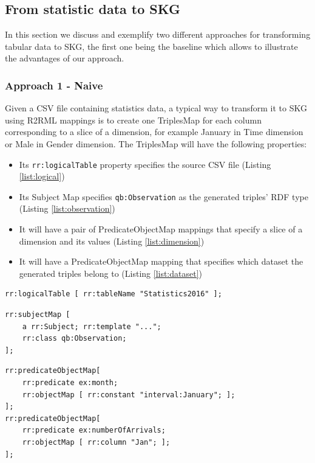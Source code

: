 \subsection{From statistic data to SKG}
In this section we discuss and exemplify two different approaches for transforming tabular data to SKG, the first one being the baseline which allows to illustrate the advantages of our approach.

\subsubsection{Approach 1 - Naive}
Given a CSV file containing statistics data, a typical way to transform it to SKG using R2RML mappings is to create one TriplesMap for each column corresponding to a slice of a dimension, for example January in Time dimension or Male in Gender dimension. The TriplesMap will have the following properties:
\begin{itemize}
\item Its \texttt{rr:logicalTable} property specifies the source CSV file (Listing \ref{list:logical})
\item Its Subject Map specifies \texttt{qb:Observation} as the generated triples’ RDF type (Listing \ref{list:observation})
\item It will have a pair of PredicateObjectMap mappings that specify a slice of a dimension and its values (Listing \ref{list:dimension})
\item It will have a PredicateObjectMap mapping that specifies which dataset the generated triples belong to (Listing \ref{list:dataset})
\end{itemize}

\begin{lstlisting}[float,caption=Data source mapping,frame=tlrb,label={list:logical}, columns=fullflexible]
rr:logicalTable [ rr:tableName "Statistics2016" ];
\end{lstlisting}

\begin{lstlisting}[float,caption=Observation mapping,frame=tlrb,label={list:observation}, columns=fullflexible]
rr:subjectMap [ 
    a rr:Subject; rr:template "..."; 
    rr:class qb:Observation; 
];
\end{lstlisting}

\begin{lstlisting}[float,caption=Dimension slice mapping,frame=tlrb,label={list:dimension}, columns=fullflexible]
rr:predicateObjectMap[ 
    rr:predicate ex:month; 
    rr:objectMap [ rr:constant "interval:January"; ];  
];
rr:predicateObjectMap[ 
    rr:predicate ex:numberOfArrivals; 
    rr:objectMap [ rr:column "Jan"; ]; 
];
\end{lstlisting}

